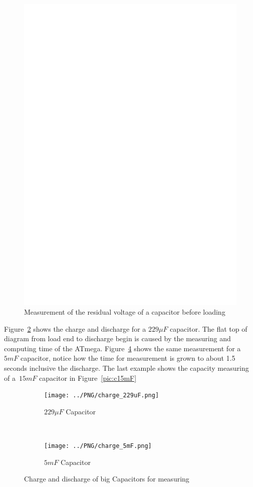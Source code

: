 \begin{figure}[H]
\centering
\includegraphics[]{../FIG/Cap_residV.eps}
\caption{Measurement of the residual voltage of a capacitor before loading}
\label{fig:CapResidV}
\end{figure}

Figure~\ref{pic:c229} shows the charge and discharge for a \(229\mu F\) capacitor.
The flat top of diagram from load end to discharge begin is caused by the measuring and computing time of the ATmega.
Figure~\ref{pic:c5mF} shows the same measurement for a~\(5mF\) capacitor,
notice how the time for measurement is grown to about 1.5 seconds inclusive the discharge. 
The last example shows the capacity measuring of a~\(15mF\) capacitor in Figure~\ref{pic:c15mF}

\begin{figure}[H]
  \begin{subfigure}[b]{9cm}
    \centering
    \texttt{[image: ../PNG/charge\_229uF.png]}
    \caption{\(229\mu F\) Capacitor}
    \label{pic:c229}
  \end{subfigure}
  ~
  \begin{subfigure}[b]{9cm}
    \centering
    \texttt{[image: ../PNG/charge\_5mF.png]}
    \caption{\(5mF\) Capacitor}
    \label{pic:c5mF}
  \end{subfigure}
  \caption{Charge and discharge of big Capacitors for measuring}
\end{figure}

